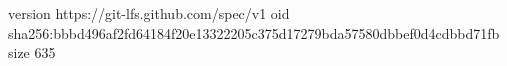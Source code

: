 version https://git-lfs.github.com/spec/v1
oid sha256:bbbd496af2fd64184f20e13322205c375d17279bda57580dbbef0d4cdbbd71fb
size 635
